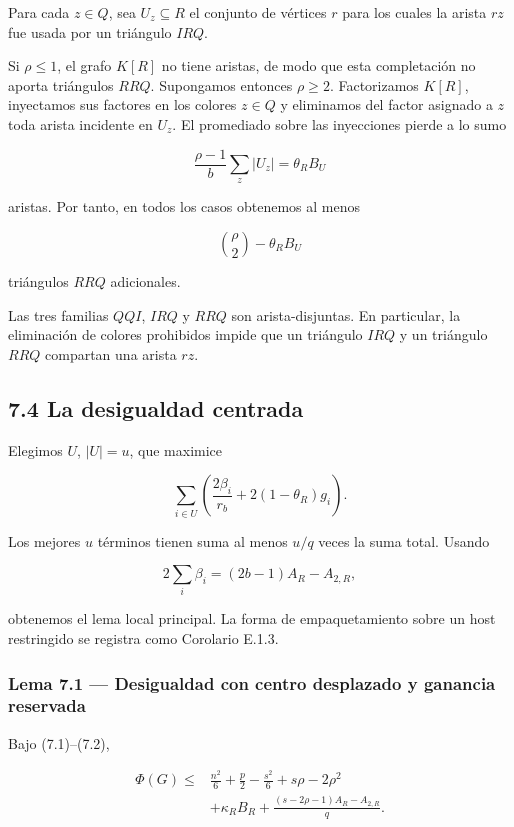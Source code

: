 \documentclass[spanish,11pt,a4paper]{article}
\begin{document}
Para cada \(z\in Q\), sea \(U_z\subseteq R\) el conjunto de vértices
\(r\) para los cuales la arista \(rz\) fue usada por un triángulo
\(IRQ\).

Si \(\rho\le1\), el grafo \(K[R]\) no tiene aristas, de modo que esta
completación no aporta triángulos \(RRQ\). Supongamos entonces
\(\rho\ge2\). Factorizamos \(K[R]\), inyectamos sus factores en los
colores \(z\in Q\) y eliminamos del factor asignado a \(z\) toda arista
incidente en \(U_z\). El promediado sobre las inyecciones pierde a lo
sumo

\[
\frac{\rho-1}{b}\sum_z|U_z|
=
\theta_RB_U
\]

aristas. Por tanto, en todos los casos obtenemos al menos

\[
\binom\rho2-\theta_RB_U
\]

triángulos \(RRQ\) adicionales.

Las tres familias \(QQI\), \(IRQ\) y \(RRQ\) son arista-disjuntas. En
particular, la eliminación de colores prohibidos impide que un triángulo
\(IRQ\) y un triángulo \(RRQ\) compartan una arista \(rz\).

\subsection{7.4 La desigualdad centrada}\label{la-desigualdad-centrada}

Elegimos \(U\), \(|U|=u\), que maximice

\[
\sum_{i\in U}
\left(
\frac{2\beta_i}{r_b}+2(1-\theta_R)g_i
\right).
\]

Los mejores \(u\) términos tienen suma al menos \(u/q\) veces la suma
total. Usando

\[
2\sum_i\beta_i
=(2b-1)A_R-A_{2,R},
\]

obtenemos el lema local principal. La forma de empaquetamiento sobre un
host restringido se registra como Corolario E.1.3.

\subsubsection{Lema 7.1 --- Desigualdad con centro desplazado y ganancia
reservada}\label{lema-7.1-desigualdad-con-centro-desplazado-y-ganancia-reservada}

Bajo (7.1)--(7.2),

\[
\boxed{
\begin{aligned}
\Phi(G)
\le{}&
\frac{n^2}{6}+\frac p2-\frac{s^2}{6}
+s\rho-2\rho^2\\
&+
\kappa_RB_R
+
\frac{(s-2\rho-1)A_R-A_{2,R}}q.
\end{aligned}
}
\tag{7.6}
\]
\end{document}
